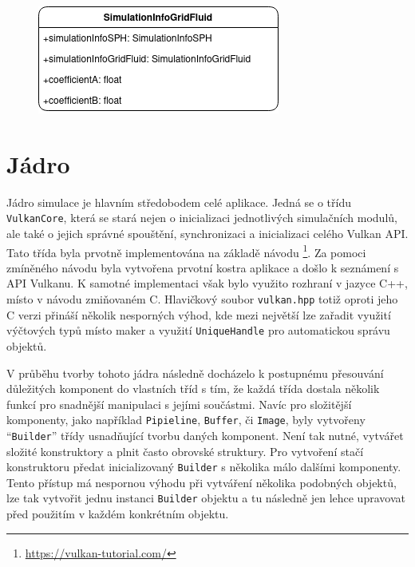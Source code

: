 \begin{figure}[hbt]
	\centering
	\captionsetup{justification=centering}
	\includegraphics[scale=0.6]{obrazky-figures/SimulationInfo.png}
	\label{fig:structsEvap}
\end{figure}


\section{Jádro}
\label{chapter:jadro}

Jádro simulace je hlavním středobodem celé aplikace. Jedná se o třídu \texttt{VulkanCore}, která se stará nejen o inicializaci jednotlivých simulačních modulů, ale také o jejich správné spouštění, synchronizaci a inicializaci celého Vulkan API. Tato třída byla prvotně implementována na základě návodu \footnote{\url{https://vulkan-tutorial.com/}}. Za pomoci zmíněného návodu byla vytvořena prvotní kostra aplikace a došlo k seznámení s API Vulkanu. K samotné implementaci však bylo využito rozhraní v jazyce C++, místo v návodu zmiňovaném C. Hlavičkový soubor \texttt{vulkan.hpp} totiž oproti jeho C verzi přináší několik nesporných výhod, kde mezi největší lze zařadit využití výčtových typů místo maker a využití \texttt{UniqueHandle} pro automatickou správu objektů. 

V průběhu tvorby tohoto jádra následně docházelo k postupnému přesouvání důležitých komponent do vlastních tříd s tím, že každá třída dostala několik funkcí pro snadnější manipulaci s jejími součástmi. Navíc pro složitější komponenty, jako například \texttt{Pipieline}, \texttt{Buffer}, či \texttt{Image}, byly vytvořeny \enquote{\texttt{Builder}} třídy usnadňující tvorbu daných komponent. Není tak nutné, vytvářet složité konstruktory a plnit často obrovské struktury. Pro vytvoření stačí konstruktoru předat inicializovaný \texttt{Builder} s několika málo dalšími komponenty. Tento přístup má nespornou výhodu při vytváření několika podobných objektů, lze tak vytvořit jednu instanci \texttt{Builder} objektu a tu následně jen lehce upravovat před použitím v každém konkrétním objektu.


